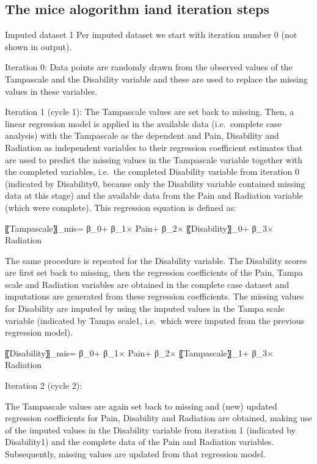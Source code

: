 \documentclass[]{book}
\begin{document}
\subsection{The mice alogorithm iand iteration
steps}\label{the-mice-alogorithm-iand-iteration-steps}

Imputed dataset 1 Per imputed dataset we start with iteration number 0
(not shown in output).

Iteration 0: Data points are randomly drawn from the observed values of
the Tampascale and the Disability variable and these are used to replace
the missing values in these variables.

Iteration 1 (cycle 1): The Tampascale values are set back to missing.
Then, a linear regression model is applied in the available data
(i.e.~complete case analysis) with the Tampascale as the dependent and
Pain, Disability and Radiation as independent variables to their
regression coefficient estimates that are used to predict the missing
values in the Tampascale variable together with the completed variables,
i.e.~the completed Disability variable from iteration 0 (indicated by
Disability0, because only the Disability variable contained missing data
at this stage) and the available data from the Pain and Radiation
variable (which were complete). This regression equation is defined as:

〖Tampascale〗\_mis= β\_0+ β\_1× Pain+ β\_2× 〖Disability〗\_0+ β\_3×
Radiation

The same procedure is repeated for the Disability variable. The
Disability scores are first set back to missing, then the regression
coefficients of the Pain, Tampa scale and Radiation variables are
obtained in the complete case dataset and imputations are generated from
these regression coefficients. The missing values for Disability are
imputed by using the imputed values in the Tampa scale variable
(indicated by Tampa scale1, i.e.~which were imputed from the previous
regression model).

〖Disability〗\_mis= β\_0+ β\_1× Pain+ β\_2× 〖Tampascale〗\_1+ β\_3×
Radiation

Iteration 2 (cycle 2):

The Tampascale values are again set back to missing and (new) updated
regression coefficients for Pain, Disability and Radiation are obtained,
making use of the imputed values in the Disability variable from
iteration 1 (indicated by Disability1) and the complete data of the Pain
and Radiation variables. Subsequently, missing values are updated from
that regression model.
\end{document}
